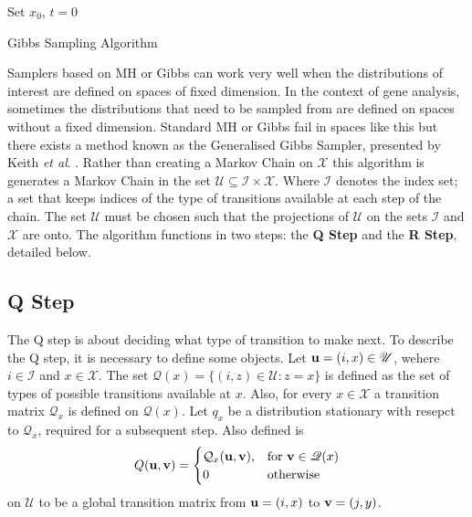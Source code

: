 \begin{algorithm}[H]
 Set $x_0$, $t=0$\; 
  \caption{Gibbs Sampling Algorithm}
\end{algorithm}

Samplers based on MH or Gibbs can work very well when the distributions of interest are defined on spaces of fixed dimension. In the context of gene analysis, sometimes the distributions that need to be sampled from are defined on spaces without a fixed dimension. Standard MH or Gibbs fail in spaces like this but there exists a method known as the Generalised Gibbs Sampler, presented by Keith \emph{et al}. \cite{keith2004generalized}. %
Rather than creating a Markov Chain on ${\mathscr X}$ this algorithm is generates a Markov Chain in the set $\mathscr U \subseteq \mathscr I \times \mathscr X$. Where $\mathscr I$ denotes the index set; a set that keeps indices of the type of transitions available at each step of the chain. The set $\mathscr U$ must be chosen such that the projections of $\mathscr U$ on the sets $\mathscr I$ and $\mathscr X$ are onto. The algorithm functions in two steps: the \textbf{Q Step} and the \textbf{R Step}, detailed below. 

\subsection{Q Step} The Q step is about deciding what type of transition to make next. 
To describe the Q step, it is necessary to define some objects. Let $\mathbf{u} = (i,x) \in {\mathscr U}$, wehere $i\in \mathscr I$ and $x\in\mathscr X$.
The set $\mathscr Q(x) = \{(i,z) \in \mathscr U : z = x\}$ is defined as the set of types of possible transitions available at $x$.
Also, for every $x \in \mathscr X$ a transition matrix $\mathcal Q_x$ is defined on $\mathscr Q(x)$. Let $q_x$ be a distribution stationary with resepct to $\mathcal Q_x$, required for a subsequent step. 
Also defined is
	\begin{equation}
		Q(\mathbf{u},\mathbf{v}) = 
			\begin{cases}
			\mathcal Q_x(\mathbf{u},\mathbf{v}), & \text{for } \mathbf{v} \in \mathscr Q(x)\\
			0 & \text{otherwise} 
			\end{cases}
		\end{equation}
on $\mathscr U$ to be a global transition matrix from $\mathbf{u} = (i,x)$ to $\mathbf{v} = (j,y)$.


